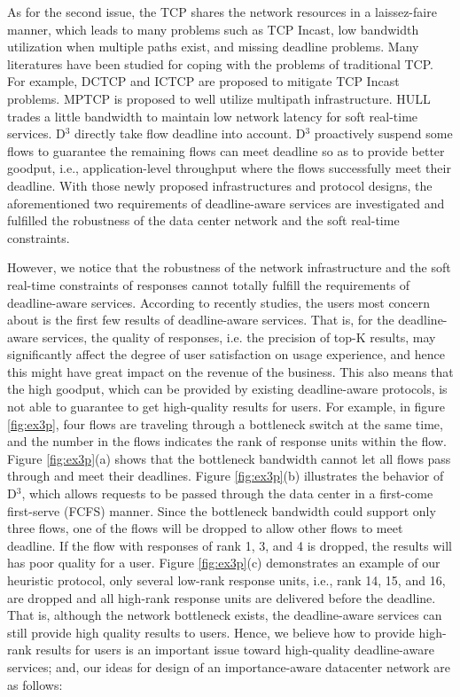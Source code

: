 \documentclass[conference]{IEEEtran}
\begin{document}
As for the second issue, the TCP shares the network resources in a laissez-faire manner, which leads to many problems such as TCP Incast\cite{incast2}, low bandwidth utilization when multiple paths exist\cite{mptcp}, and missing deadline\cite{deadline} problems. Many literatures have been studied for coping with the problems of traditional TCP. For example, DCTCP\cite{dctcp} and ICTCP\cite{ictcp} are proposed to mitigate TCP Incast problems. MPTCP\cite{mptcp} is proposed to well utilize multipath infrastructure. HULL\cite{hull} trades a little bandwidth to maintain low network latency for soft real-time services. D$^{3}$\cite{deadline} directly take flow deadline into account. D$^{3}$ proactively suspend some flows to guarantee the remaining flows can meet deadline so as to provide better goodput, i.e., application-level throughput where the flows successfully meet their deadline. With those newly proposed infrastructures and protocol designs, the aforementioned two requirements of deadline-aware services are investigated and fulfilled the robustness of the data center network and the soft real-time constraints.

However, we notice that the robustness of the network infrastructure and the soft real-time constraints of responses cannot totally fulfill the requirements of deadline-aware services. According to recently studies\cite{lagun2011viewser, buscher2010good, cutrell2007you, lorigo2008eye}, the users most concern about is the first few results of deadline-aware services. That is, for the deadline-aware services, the quality of responses, i.e. the precision of top-K results, may significantly affect the degree of user satisfaction on usage experience, and hence this might have great impact on the revenue of the business. This also means that the high goodput, which can be provided by existing deadline-aware protocols\cite{deadline}, is not able to guarantee to get high-quality results for users. For example, in figure \ref{fig:ex3p}, four flows are traveling through a bottleneck switch at the same time, and the number in the flows indicates the rank of response units within the flow. Figure \ref{fig:ex3p}(a) shows that the bottleneck bandwidth cannot let all flows pass through and meet their deadlines. Figure \ref{fig:ex3p}(b) illustrates the behavior of D$^{3}$, which allows requests to be passed through the data center in a first-come first-serve (FCFS) manner. Since the bottleneck bandwidth could support only three flows, one of the flows will be dropped to allow other flows to meet deadline. If the flow with responses of rank 1, 3, and 4 is dropped, the results will has poor quality for a user. Figure \ref{fig:ex3p}(c) demonstrates an example of our heuristic protocol, only several low-rank response units, i.e., rank 14, 15, and 16, are dropped and all high-rank response units are delivered before the deadline. That is, although the network bottleneck exists, the deadline-aware services can still provide high quality results to users. Hence, we believe how to provide high-rank results for users is an important issue toward high-quality deadline-aware services; and, our ideas for design of an importance-aware datacenter network are as follows:
\end{document}
